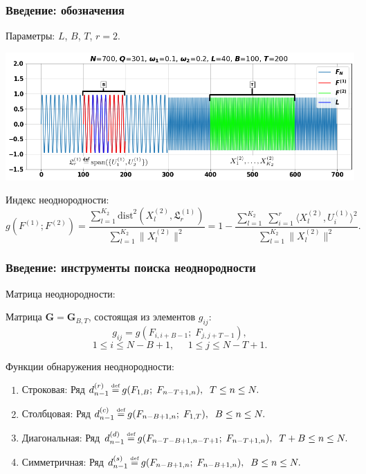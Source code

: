 \documentclass[pdf, 9pt,intlimits, unicode]{beamer}
\DeclareMathOperator{\mathspan}{span}
\newcommand\eqdef{\mathrel{\stackrel{\makebox[0pt]{\mbox{\normalfont\tiny def}}}{=}}}
\begin{document}
	\begin{frame}
		\frametitle{Введение: обозначения}	
		{\color{blue} Параметры:} $ L $, $ B $, $ T $, $ r = 2 $.
		\begin{center}
			\includegraphics[width=\linewidth]{imgs/designations}
		\end{center}

		\bigskip
		
		{\color{blue} Индекс неоднородности:} 
		\small{
			$$ g(F^{(1)}; F^{(2)}) = \frac{\sum\limits_{l=1}^{K_2}\mathrm{dist}^2(X_l^{(2)}, \mathfrak{L}_r^{(1)})}{\sum\limits_{l=1}^{K_2}\|X_l^{(2)}\|^2} =
			1 - \frac{\sum\limits_{l=1}^{K_2}\;\sum\limits_{i=1}^{r}\langle X_l^{(2)}, U_i^{(1)}\rangle^2}{\sum\limits_{l=1}^{K_2}\|X_l^{(2)}\|^2}. $$
		}
	\end{frame}

	\begin{frame}
		\frametitle{Введение: инструменты поиска неоднородности}	
		
	
		\bigskip
		
		{\color{blue} Матрица неоднородности:}
		
		Матрица $ \mathbf{G} = \mathbf{G}_{B, T} $, состоящая из элементов $g_{ij}$:
		$$g_{ij} = g(F_{i, i+B-1};\;F_{j, j+T-1}), $$ 
		$$1 \leq i \leq N-B+1,\;\;\;\;\; 1 \leq j \leq N-T+1.$$
		
		\bigskip
		
		{\color{blue} Функции обнаружения неоднородности:}
		\begin{enumerate}
			\item Строковая: Ряд $ d_{n-1}^{(r)} \eqdef g(F_{1, B};\; F_{n-T+1, n}), \;\; T \leq n \leq N. $
			
			\item Столбцовая: Ряд $ d_{n-1}^{(c)} \eqdef g(F_{n-B+1, n};\; F_{1, T}), \;\; B \leq n \leq N. $
			
			\item Диагональная: Ряд $ d_{n-1}^{(d)} \eqdef g(F_{n-T-B+1, n-T+1};\; F_{n-T+1, n}), \;\; T + B \leq n \leq N. $
			
			\item Симметричная: Ряд $ d_{n-1}^{(s)} \eqdef g(F_{n-B+1, n};\; F_{n-B+1, n}), \;\; B \leq n \leq N. $
			
		\end{enumerate}
	\end{frame}
\end{document}
